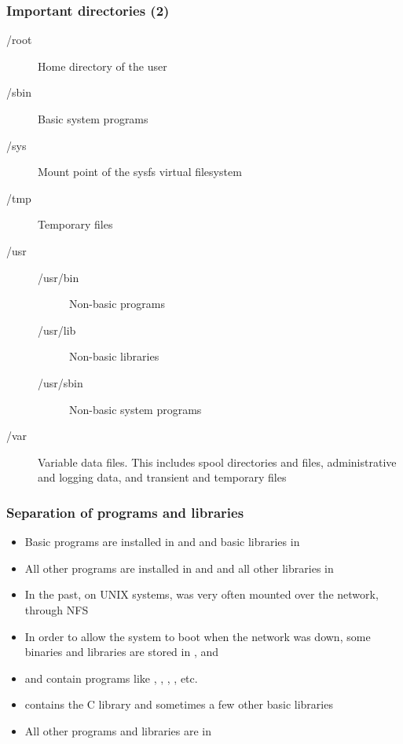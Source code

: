 \begin{frame}
  \frametitle{Important directories (2)}
  \begin{description}
  \item[/root]Home directory of the  user
  \item[/sbin]Basic system programs
  \item[/sys]Mount point of the sysfs virtual filesystem
  \item[/tmp]Temporary files
  \item[/usr]
    \begin{description}
    \item[/usr/bin]Non-basic programs
    \item[/usr/lib]Non-basic libraries
    \item[/usr/sbin]Non-basic system programs
    \end{description}
  \item[/var] Variable data files. This includes spool directories and
    files, administrative and logging data, and transient and
    temporary files
  \end{description}
\end{frame}

\begin{frame}
  \frametitle{Separation of programs and libraries}
  \begin{itemize}
  \item Basic programs are installed in  and 
    and basic libraries in 
  \item All other programs are installed in  and
     and all other libraries in 
  \item In the past, on UNIX systems,  was very often
    mounted over the network, through NFS
  \item In order to allow the system to boot when the network was
    down, some binaries and libraries are stored in ,
     and 
  \item {} and  contain programs like ,
    , , , etc.
  \item {} contains the C library and sometimes a few other
    basic libraries
  \item All other programs and libraries are in 
  \end{itemize}
\end{frame}
